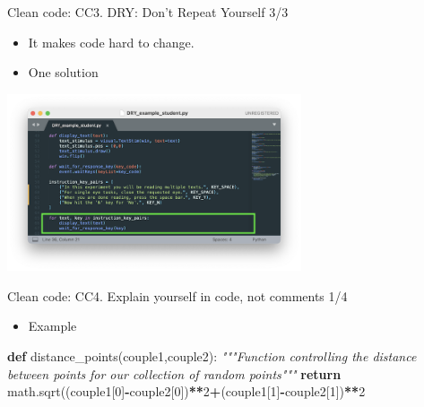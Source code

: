 \documentclass[
  8pt,
  ignorenonframetext,
]{beamer}
\newenvironment{Shaded}{\begin{snugshade}}{\end{snugshade}}
\newcommand{\CommentTok}[1]{\textcolor[rgb]{0.56,0.35,0.01}{\textit{#1}}}
\newcommand{\ControlFlowTok}[1]{\textcolor[rgb]{0.13,0.29,0.53}{\textbf{#1}}}
\newcommand{\DecValTok}[1]{\textcolor[rgb]{0.00,0.00,0.81}{#1}}
\newcommand{\KeywordTok}[1]{\textcolor[rgb]{0.13,0.29,0.53}{\textbf{#1}}}
\newcommand{\NormalTok}[1]{#1}
\newcommand{\OperatorTok}[1]{\textcolor[rgb]{0.81,0.36,0.00}{\textbf{#1}}}
\providecommand{\tightlist}{%
  \setlength{\itemsep}{0pt}\setlength{\parskip}{0pt}}
\begin{document}
\begin{frame}{Clean code: CC3. DRY: Don't Repeat Yourself 3/3}
\protect\hypertarget{clean-code-cc3.-dry-dont-repeat-yourself-33}{}
\begin{itemize}
\item
  It makes code hard to change.
\item
  One solution
\end{itemize}

\includegraphics[width=0.65\textwidth,height=\textheight]{student_example1_corrected.png}
\end{frame}

\begin{frame}[fragile]{Clean code: CC4. Explain yourself in code, not
comments 1/4}
\protect\hypertarget{clean-code-cc4.-explain-yourself-in-code-not-comments-14}{}
\begin{itemize}
\tightlist
\item
  Example
\end{itemize}

\begin{Shaded}
\begin{Highlighting}[]
\KeywordTok{def}\NormalTok{ distance\_points(couple1,couple2):}
    \CommentTok{"""Function controlling the distance between points}
\CommentTok{    for our collection of random points"""}
    \ControlFlowTok{return}\NormalTok{ math.sqrt((couple1[}\DecValTok{0}\NormalTok{]}\OperatorTok{{-}}\NormalTok{couple2[}\DecValTok{0}\NormalTok{])}\OperatorTok{**}\DecValTok{2}\OperatorTok{+}\NormalTok{(couple1[}\DecValTok{1}\NormalTok{]}\OperatorTok{{-}}\NormalTok{couple2[}\DecValTok{1}\NormalTok{])}\OperatorTok{**}\DecValTok{2}
\end{Highlighting}
\end{Shaded}
\end{frame}
\end{document}

